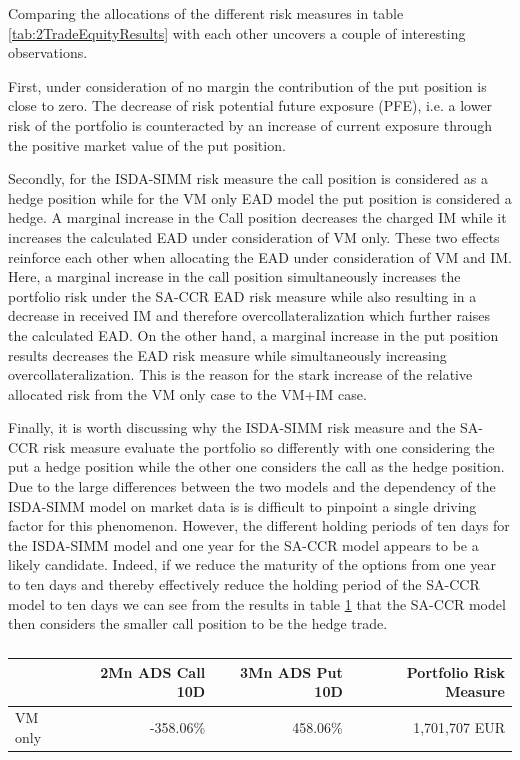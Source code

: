 \documentclass[../Thesis_AHoecherl.tex]{subfiles}
\begin{document}
    Comparing the allocations of the different risk measures in table \ref{tab:2TradeEquityResults} with each other uncovers a couple of interesting observations. 
    
    First, under consideration of no margin the contribution of the put position is close to zero. The decrease of risk potential future exposure (PFE), i.e. a lower risk of the portfolio is counteracted by an increase of current exposure through the positive market value of the put position.

    Secondly, for the ISDA-SIMM risk measure the call position is considered as a hedge position while for the VM only EAD model the put position is considered a hedge. A marginal increase in the Call position decreases the charged IM while it increases the calculated EAD under consideration of VM only. These two effects reinforce each other when allocating the EAD under consideration of VM and IM. Here, a marginal increase in the call position simultaneously increases the portfolio risk under the SA-CCR EAD risk measure while also resulting in a decrease in received IM and therefore overcollateralization which further raises the calculated EAD. On the other hand, a marginal increase in the put position results decreases the EAD risk measure while simultaneously increasing overcollateralization. This is the reason for the stark increase of the relative allocated risk from the VM only case to the VM+IM case.

    Finally, it is worth discussing why the ISDA-SIMM risk measure and the SA-CCR risk measure evaluate the portfolio so differently with one considering the put a hedge position while the other one considers the call as the hedge position.
    Due to the large differences between the two models and the dependency of the ISDA-SIMM model on market data is is difficult to pinpoint a single driving factor for this phenomenon.
    However, the different holding periods of ten days for the ISDA-SIMM model and one year for the SA-CCR model appears to be a likely candidate. Indeed, if we reduce the maturity of the options from one year to ten days and thereby effectively reduce the holding period of the SA-CCR model to ten days we can see from the results in table \ref{tab:2TradeEquity10dayEAD} that the SA-CCR model then considers the smaller call position to be the hedge trade.

    \begin{table}[htbp]
        \centering
        \begin{tabular}{l||r|r|r}
                & 2Mn ADS Call 10D &3Mn ADS Put 10D & Portfolio Risk Measure \\
                \toprule
        VM only & -358.06\% & 458.06\% & 1,701,707 EUR \\
        \end{tabular}%
        \caption{}
        \label{tab:2TradeEquity10dayEAD}%
    \end{table}%
\end{document}
